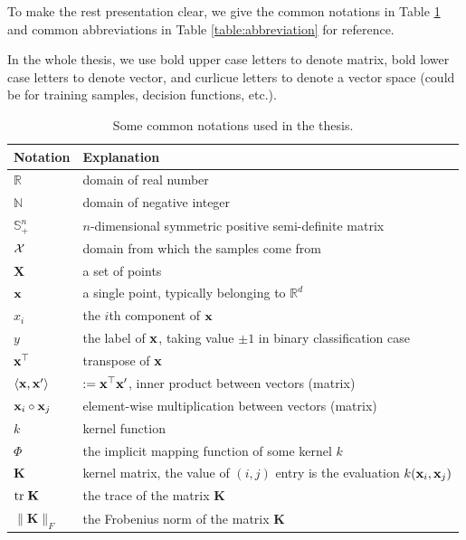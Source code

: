 To make the rest presentation clear, we give the common notations in Table \ref{table:notation} and common abbreviations in Table \ref{table:abbreviation} for reference.

In the whole thesis, we use bold upper case letters to denote matrix, bold lower case letters to denote vector, and curlicue letters to denote a vector space (could be for training samples, decision functions, etc.).

\begin{table}[!ht]
\centering \caption{Some common notations used in the thesis. } \label{table:notation}
\begin{center}

\begin{tabular}{ll}
\hline
\hline
Notation &Explanation\\
\hline
$\mathbb R$ &domain of real number\\
$\mathbb N$ &domain of negative integer\\
$\mathbb S^n_+$ &$n$-dimensional symmetric positive semi-definite matrix\\
${\cal X}$ &domain from which the samples come from\\
$\mathbf X$ & a set of points\\
$\mathbf{x}$  &a single point, typically belonging to $\mathbb R^d$\\
$x_i$ &the $i$th component of $\mathbf{x}$\\
$y$   &the label of $\mathbf{x}$, taking value $\pm1$ in binary classification case\\
$\mathbf{x}^\top$ &transpose of $\mathbf{x}$\\
$\langle \mathbf{x}, \mathbf{x}' \rangle$ &$:=\mathbf{x}^\top\mathbf{x}'$, inner product between vectors (matrix)\\
$\mathbf{x}_i\circ\mathbf{x}_j$ &element-wise multiplication between vectors (matrix)\\
$k$   &kernel function\\
$\Phi$  & the implicit mapping function of some kernel $k$\\
$\mathbf K$   &kernel matrix, the value of $(i,j)$ entry is the evaluation $k(\mathbf{x}_i,\mathbf{x}_j)$\\
${\mbox{tr}\;} \mathbf K$ & the trace of the matrix $\mathbf K$\\
$\| \mathbf K\|_F$ &the Frobenius norm of the matrix $\mathbf K$\\

\end{tabular}
\end{center}
\end{table}
